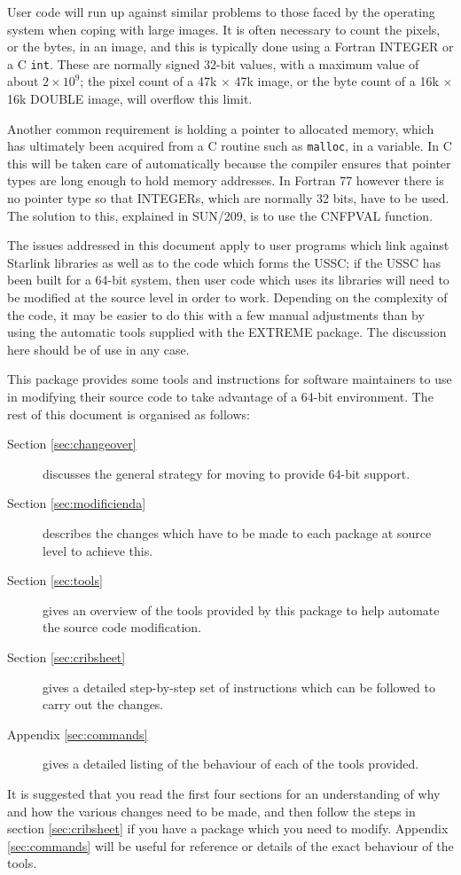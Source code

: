 \documentclass[twoside,11pt]{article}
\newcommand{\xref}[3]{#1}
\renewcommand{\_}{\texttt{\symbol{95}}}
\newcommand{\cc}[1]{{\tt #1}}
\begin{document}
User code will run up against similar problems to those faced by
the operating system when coping with large images.
It is often necessary to count the pixels, or the bytes,
in an image, and this is typically done using a Fortran INTEGER
or a C \cc{int}.  These are normally signed 32-bit values, with
a maximum value of about $2 \times 10^9$; the pixel count of a 
47k $\times$ 47k image, or the byte count of a 16k $\times$ 16k 
\_DOUBLE image, will overflow this limit.

Another common requirement is holding a pointer 
to allocated memory, which has ultimately been 
acquired from a C routine such as \cc{malloc}, 
in a variable.
In C this will be taken care of automatically because the compiler
ensures that pointer types are long enough to hold memory addresses.
In Fortran 77 however there is no pointer type so that INTEGERs, which are
normally 32 bits, have to be used.
The solution to this, explained in \xref{SUN/209}{sun209}{pointers},
is to use the \xref{CNF\_PVAL}{sun209}{CNF\_PVAL} function.

The issues addressed in this document apply to user programs which link
against Starlink libraries as well as to the code which forms the USSC;
if the USSC has been built for a 64-bit system, then user code 
which uses its libraries will need to be modified at the 
source level in order to work.
Depending on the complexity of the code, it may be easier to do this
with a few manual adjustments than by using the automatic 
tools supplied with the EXTREME package.  
The discussion here should be of use in any case.

This package provides some tools and instructions for 
software maintainers to use 
in modifying their source code to take advantage of a 64-bit environment.
The rest of this document is organised as follows:
\begin{description}
%
\item[Section \ref{sec:changeover}]
discusses the general strategy for moving to provide 64-bit support.
%
\item[Section \ref{sec:modificienda}]
describes the changes which have to be made to each package at 
source level to achieve this.
%
\item[Section \ref{sec:tools}]
gives an overview of the tools provided by this package to help automate 
the source code modification.
%
\item[Section \ref{sec:cribsheet}]
gives a detailed step-by-step set of instructions which can be followed 
to carry out the changes.
%
\item[Appendix \ref{sec:commands}]
gives a detailed listing of the behaviour of each of the tools provided.
%
\end{description}
It is suggested that you read the first four sections
for an understanding of why and how the various changes need to be 
made, and then follow the steps in section \ref{sec:cribsheet}
if you have a package which you need to modify.
Appendix \ref{sec:commands} will be useful for reference or details
of the exact behaviour of the tools.
\end{document}
